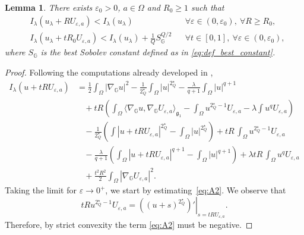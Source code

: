 \documentclass[11pt]{amsart}
\numberwithin{equation}{section} %
\newtheorem{lemma}[teo]{Lemma}
\theoremstyle{definition}
\def\G{\mathbb{G}}
\begin{document}
\begin{lemma}\label{lem:claim2.7haitao}
	There exists $\varepsilon_0>0$, $a\in\Omega$ and $R_0\geq1$ such that
\begin{align}
	 & I_\lambda(u_\lambda + R U_{\varepsilon,a}) < I_\lambda(u_\lambda) 
	&& \forall \varepsilon \in (0, \varepsilon_0),\ \forall R \geq R_0, \\
& I_\lambda(u_\lambda + t R_0 U_{\varepsilon,a}) < I_\lambda(u_\lambda) + \frac{1}{Q} S_\G^{Q/2} 
	&& \forall t \in [0, 1],\ \forall \varepsilon \in (0, \varepsilon_0),\label{eq:lemma2.7Haitao}
\end{align}
where $S_\G$ is the best Sobolev constant defined as in  \eqref{eq:def_best_constant}.
\end{lemma}
\begin{proof}
Following the computations already developed in \cite{BiGaVe},
\begin{align*}
    I_\lambda(u+tRU_{\varepsilon,a})&=
    \frac{1}{2}\int_{\Omega}|\nabla_{\G}u|^2-\frac{1}{2^\star_Q}\int_{\Omega} |u|^{2^\star_Q}-\frac{\lambda}{q+1}\int_{\Omega} |u|^{q+1}\\
    &\ \ \ \ +tR \left(\int_{\Omega}\langle \nabla_{\G}u,\nabla_{\G}U_{\varepsilon,a}\rangle_{\mathfrak{g}_{1}}-\int_{\Omega} u^{2^\star_Q -1}U_{\varepsilon,a}-\lambda\int u^qU_{\varepsilon,a}\right)\tag{C}\label{eq:C}\\
    &\ \ \ \ -\frac{1}{2^\star_Q}\left(\int|u+tRU_{\varepsilon,a}|^{2^\star_Q}-\int_{\Omega} |u|^{2^\star_Q}\right)+tR\, \int_{\Omega} u^{2^\star_Q -1}U_{\varepsilon,a}\tag{A}\label{eq:A1}\\
     &\ \ \ \ -\frac{\lambda}{q+1}\left(\int_{\Omega}|u+tRU_{\varepsilon,a}|^{q+1}-\int_{\Omega} |u|^{q+1}\right)+ \lambda tR\, \int_{\Omega} u^qU_{\varepsilon,a}\tag{A2}\label{eq:A2}\\
    &\ \ \ \ +\frac{t^2R^2}{2} \int_{\Omega}|\nabla_{\G}U_{\varepsilon,a}|^2.\tag{B}\label{eq:B}
\end{align*}
Taking the limit for $\varepsilon\to0^+$, we 
start by estimating~\eqref{eq:A2}.
We observe that 
\[
tRu^{2^\star_Q -1}U_{\varepsilon,a}=\left.\left((u+s)^{2^\star_Q}\right)'\right|_{s=tRU_{\varepsilon,a}}.
\]
Therefore, by  strict convexity the term \eqref{eq:A2} must be negative.


\end{proof}
\end{document}
